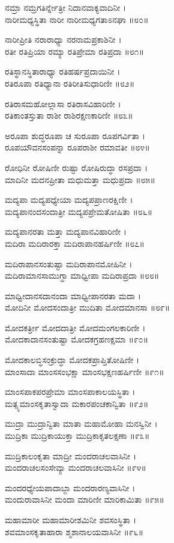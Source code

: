 ನಮ್ರಾ ನಮ್ರಗತಿರ್ನ್ನೇತ್ರೀ ನಿದಾನವಾಕ್ಯವಾದಿನೀ ।\\
ನಾರೀಮಧ್ಯಸ್ಥಿತಾ ನಾರೀ ನಾರೀಮಧ್ಯಗತಾಽನಘಾ ॥೮೦॥

ನಾರೀಪ್ರೀತಿ ನರಾರಾಧ್ಯಾ ನರನಾಮಪ್ರಕಾಶಿನೀ ।\\
ರತೀ ರತಿಪ್ರಿಯಾ ರಮ್ಯಾ ರತಿಪ್ರೇಮಾ ರತಿಪ್ರದಾ ॥೮೧॥

ರತಿಸ್ಥಾನಸ್ಥಿತಾರಾಧ್ಯಾ ರತಿಹರ್ಷಪ್ರದಾಯಿನೀ ।\\
ರತಿರೂಪಾ ರತಿಧ್ಯಾನಾ ರತಿರೀತಿಸುಧಾರಿಣೀ ॥೮೨॥

ರತಿರಾಸಮಹೋಲ್ಲಾಸಾ ರತಿರಾಸವಿಹಾರಿಣೀ ।\\
ರತಿಕಾಂತಸ್ತುತಾ ರಾಶೀ ರಾಶಿರಕ್ಷಣಕಾರಿಣೀ ॥೮೩॥

ಅರೂಪಾ ಶುದ್ಧರೂಪಾ ಚ ಸುರೂಪಾ ರೂಪಗರ್ವಿತಾ ।\\
ರೂಪಯೌವನಸಂಪನ್ನಾ ರೂಪರಾಶೀ ರಮಾವತೀ ॥೮೪॥

ರೋಧಿನೀ ರೋಷಿಣೀ ರುಷ್ಟಾ ರೋಷಿರುದ್ಧಾ ರಸಪ್ರದಾ ।\\
ಮಾದಿನೀ ಮದನಪ್ರೀತಾ ಮಧುಮತ್ತಾ ಮಧುಪ್ರದಾ ॥೮೫॥

ಮದ್ಯಪಾ ಮದ್ಯಪಧ್ಯೇಯಾ ಮದ್ಯಪಪ್ರಾಣರಕ್ಷಿಣೀ ।\\
ಮದ್ಯಪಾನಂದಸಂದಾತ್ರೀ ಮದ್ಯಪಪ್ರೇಮತೋಷಿತಾ ॥೮೬॥

ಮದ್ಯಪಾನರತಾ ಮತ್ತಾ ಮದ್ಯಪಾನವಿಹಾರಿಣೀ ।\\
ಮದಿರಾ ಮದಿರಾರಕ್ತಾ ಮದಿರಾಪಾನಹರ್ಷಿಣೀ ॥೮೭॥

ಮದಿರಾಪಾನಸಂತುಷ್ಟಾ ಮದಿರಾಪಾನಮೋಹಿನೀ ।\\
ಮದಿರಾಮಾನಸಾಮುಗ್ಧಾ ಮಾಧ್ವೀಪಾ ಮದಿರಾಪ್ರದಾ ॥೮೮॥

ಮಾಧ್ವೀದಾನಸದಾನಂದಾ ಮಾಧ್ವೀಪಾನರತಾ ಮದಾ ।\\
ಮೋದಿನೀ ಮೋದಸಂದಾತ್ರೀ ಮುದಿತಾ ಮೋದಮಾನಸಾ ॥೮೯॥

ಮೋದಕರ್ತ್ರೀ ಮೋದದಾತ್ರೀ ಮೋದಮಂಗಲಕಾರಿಣೀ ।\\
ಮೋದಕಾದಾನಸಂತುಷ್ಟಾ ಮೋದಕಗ್ರಹಣಕ್ಷಮಾ ॥೯೦॥

ಮೋದಕಾಲಬ್ಧಿಸಂಕ್ರುದ್ಧಾ ಮೋದಕಪ್ರಾಪ್ತಿತೋಷಿಣೀ ।\\
ಮಾಂಸಾದಾ ಮಾಂಸಸಂಭಕ್ಷಾ ಮಾಂಸಭಕ್ಷಣಹರ್ಷಿಣೀ ॥೯೧॥

ಮಾಂಸಪಾಕಪರಪ್ರೇಮಾ ಮಾಂಸಪಾಕಾಲಯಸ್ಥಿತಾ ।\\
ಮತ್ಸ್ಯಮಾಂಸಕೃತಾಸ್ವಾದಾ ಮಕಾರಪಂಚಕಾನ್ವಿತಾ ॥೯೨॥

ಮುದ್ರಾ ಮುದ್ರಾನ್ವಿತಾ ಮಾತಾ ಮಹಾಮೋಹಾ ಮನಸ್ವಿನೀ ।\\
ಮುದ್ರಿಕಾ ಮುದ್ರಿಕಾಯುಕ್ತಾ ಮುದ್ರಿಕಾಕೃತಲಕ್ಷಣಾ ॥೯೩॥

ಮುದ್ರಿಕಾಲಂಕೃತಾ ಮಾದ್ರೀ ಮಂದರಾಚಲವಾಸಿನೀ ।\\
ಮಂದರಾಚಲಸಂಸೇವ್ಯಾ ಮಂದರಾಚಲವಾಸಿನೀ ॥೯೪॥

ಮಂದರಧ್ಯೇಯಪಾದಾಬ್ಜಾ ಮಂದರಾರಣ್ಯವಾಸಿನೀ ।\\
ಮಂದುರಾವಾಸಿನೀ ಮಂದಾ ಮಾರಿಣೀ ಮಾರಿಕಾಮಿತಾ ॥೯೫॥

ಮಹಾಮಾರೀ ಮಹಾಮಾರೀಶಮಿನೀ ಶವಸಂಸ್ಥಿತಾ ।\\
ಶವಮಾಂಸಕೃತಾಹಾರಾ ಶ್ಮಶಾನಾಲಯವಾಸಿನೀ ॥೯೬॥

